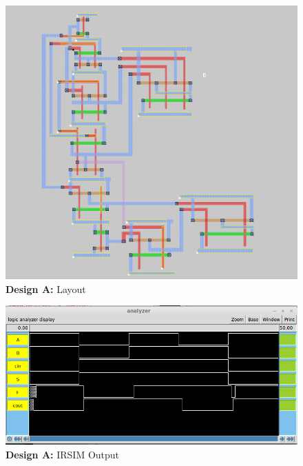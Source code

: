 \documentclass{article}
\begin{document}
\begin{figure}[H]
    \centering
    \includegraphics[width=\linewidth]{../part_3/xiaohui/magicslice.png}
    \caption{\textbf{Design A:} Layout}
\end{figure}

\newpage


\begin{figure}[H]
    \centering
    \includegraphics[width=\linewidth]{../part_3/xiaohui/irsimwaveform.png}
    \caption{\textbf{Design A:} IRSIM Output}
\end{figure}


\end{document}

